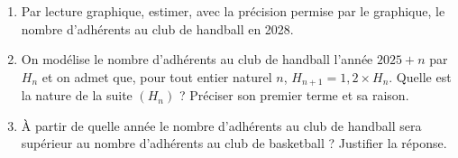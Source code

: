 \documentclass[10pt]{article}
\begin{document}
	\begin{enumerate}[start=4]
		\item Par lecture graphique, estimer, avec la précision permise par le graphique, le nombre d'adhérents au club de handball en 2028.
		\item On modélise le nombre d'adhérents au club de handball l'année $2025+n$ par $H_{n}$ et on admet que, pour tout entier naturel $n$, $H_{n+1}=1{,}2\times H_{n}$. Quelle est la nature de la suite $\left(H_{n}\right)$ ? Préciser son premier terme et sa raison.
		\item À partir de quelle année le nombre d'adhérents au club de handball sera supérieur au nombre d'adhérents au club de basketball ? Justifier la réponse.
	\end{enumerate}
\end{document}
